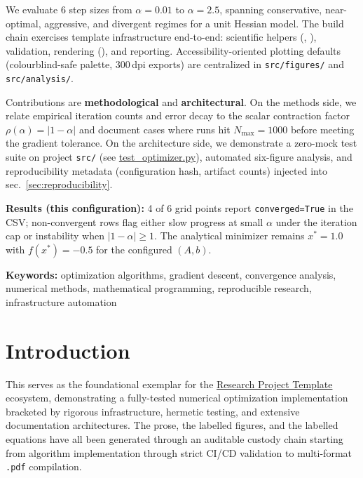 \documentclass[
  english,
]{article}
\begin{document}
We evaluate 6 step sizes from \(\alpha = 0.01\) to \(\alpha = 2.5\),
spanning conservative, near-optimal, aggressive, and divergent regimes
for a unit Hessian model. The build chain exercises template
infrastructure end-to-end: scientific helpers
(,
), validation, rendering
(), and reporting.
Accessibility-oriented plotting defaults (colourblind-safe palette,
300\,dpi exports) are centralized in \texttt{src/figures/} and
\texttt{src/analysis/}.

Contributions are \textbf{methodological} and \textbf{architectural}. On
the methods side, we relate empirical iteration counts and error decay
to the scalar contraction factor \(\rho(\alpha) = |1-\alpha|\) and
document cases where runs hit \(N_{\max} = 1000\) before meeting the
gradient tolerance. On the architecture side, we demonstrate a zero-mock
test suite on project \texttt{src/} (see
\href{https://github.com/docxology/template/blob/main/projects/templates/template_code_project/tests/test_optimizer.py}{test\_optimizer.py}),
automated six-figure analysis, and reproducibility metadata
(configuration hash, artifact counts) injected into
sec.~\ref{sec:reproducibility}.

\textbf{Results (this configuration):} 4 of 6 grid points report
\texttt{converged=True} in the CSV; non-convergent rows flag either slow
progress at small \(\alpha\) under the iteration cap or instability when
\(|1-\alpha| \geq 1\). The analytical minimizer remains \(x^\ast = 1.0\)
with \(f(x^\ast) = -0.5\) for the configured \((A,b)\).

\textbf{Keywords:} optimization algorithms, gradient descent,
convergence analysis, numerical methods, mathematical programming,
reproducible research, infrastructure automation

\newpage

\section{Introduction}\label{sec:introduction}

This  serves as the foundational
exemplar for the \href{https://github.com/docxology/template}{Research
Project Template} ecosystem, demonstrating a fully-tested numerical
optimization implementation bracketed by rigorous infrastructure,
hermetic testing, and extensive documentation architectures. The prose,
the labelled figures, and the labelled equations have all been generated
through an auditable custody chain starting from algorithm
implementation through strict CI/CD validation to multi-format
\texttt{.pdf} compilation.
\end{document}
